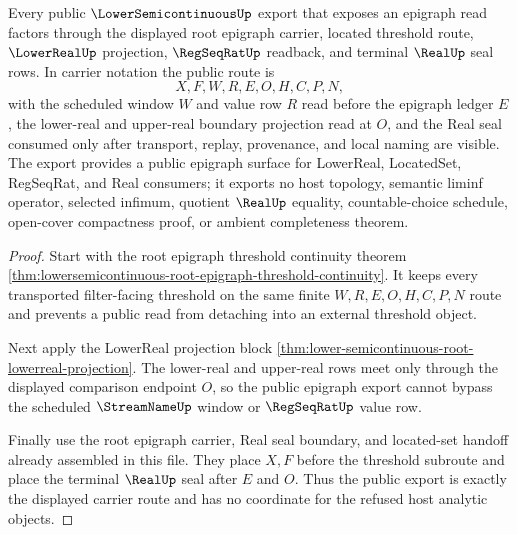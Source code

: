 \begin{theorem}
\label{thm:lowersemicontinuous-public-epigraph-export-route}
Every public $\LowerSemicontinuousUp$ export that exposes an epigraph read factors through the displayed root epigraph carrier, located threshold route, $\LowerRealUp$ projection, $\RegSeqRatUp$ readback, and terminal $\RealUp$ seal rows. In carrier notation the public route is
$$
X,F,W,R,E,O,H,C,P,N ,
$$
with the scheduled window $W$ and value row $R$ read before the epigraph ledger $E$, the lower-real and upper-real boundary projection read at $O$, and the Real seal consumed only after transport, replay, provenance, and local naming are visible. The export provides a public epigraph surface for LowerReal, LocatedSet, RegSeqRat, and Real consumers; it exports no host topology, semantic liminf operator, selected infimum, quotient $\RealUp$ equality, countable-choice schedule, open-cover compactness proof, or ambient completeness theorem.
\end{theorem}
\begin{proof}
Start with the root epigraph threshold continuity theorem \autoref{thm:lowersemicontinuous-root-epigraph-threshold-continuity}. It keeps every transported filter-facing threshold on the same finite $W,R,E,O,H,C,P,N$ route and prevents a public read from detaching into an external threshold object.

Next apply the LowerReal projection block \autoref{thm:lower-semicontinuous-root-lowerreal-projection}. The lower-real and upper-real rows meet only through the displayed comparison endpoint $O$, so the public epigraph export cannot bypass the scheduled $\StreamNameUp$ window or $\RegSeqRatUp$ value row.

Finally use the root epigraph carrier, Real seal boundary, and located-set handoff already assembled in this file. They place $X,F$ before the threshold subroute and place the terminal $\RealUp$ seal after $E$ and $O$. Thus the public export is exactly the displayed carrier route and has no coordinate for the refused host analytic objects.
\end{proof}

